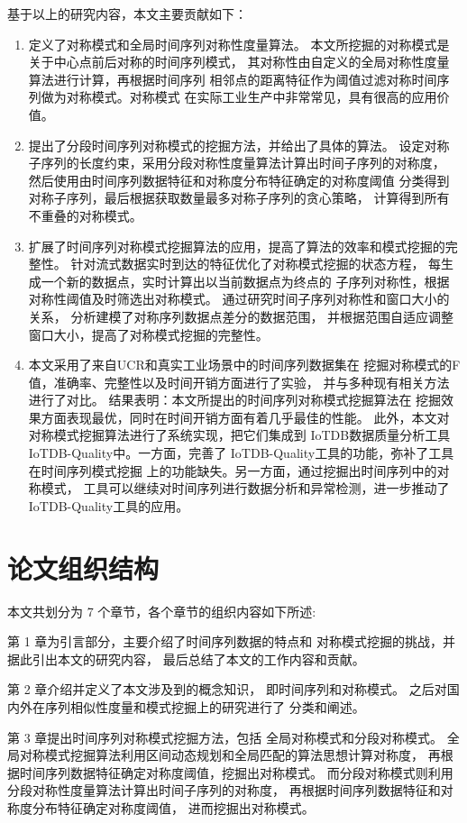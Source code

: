 基于以上的研究内容，本文主要贡献如下：
\begin{enumerate}
\item 定义了对称模式和全局时间序列对称性度量算法。
本文所挖掘的对称模式是关于中心点前后对称的时间序列模式，
其对称性由自定义的全局对称性度量算法进行计算，再根据时间序列
相邻点的距离特征作为阈值过滤对称时间序列做为对称模式。对称模式
在实际工业生产中非常常见，具有很高的应用价值。
\item 提出了分段时间序列对称模式的挖掘方法，并给出了具体的算法。
设定对称子序列的长度约束，采用分段对称性度量算法计算出时间子序列的对称度，
然后使用由时间序列数据特征和对称度分布特征确定的对称度阈值
分类得到对称子序列，最后根据获取数量最多对称子序列的贪心策略，
计算得到所有不重叠的对称模式。
\item 扩展了时间序列对称模式挖掘算法的应用，提高了算法的效率和模式挖掘的完整性。
针对流式数据实时到达的特征优化了对称模式挖掘的状态方程，
每生成一个新的数据点，实时计算出以当前数据点为终点的
子序列对称性，根据对称性阈值及时筛选出对称模式。
通过研究时间子序列对称性和窗口大小的关系，
分析建模了对称序列数据点差分的数据范围，
并根据范围自适应调整窗口大小，提高了对称模式挖掘的完整性。
\item 本文采用了来自UCR和真实工业场景中的时间序列数据集在
挖掘对称模式的F值，准确率、完整性以及时间开销方面进行了实验，
并与多种现有相关方法进行了对比。
结果表明：本文所提出的时间序列对称模式挖掘算法在
挖掘效果方面表现最优，同时在时间开销方面有着几乎最佳的性能。
此外，本文对对称模式挖掘算法进行了系统实现，把它们集成到
IoTDB数据质量分析工具IoTDB-Quality中。一方面，完善了
IoTDB-Quality工具的功能，弥补了工具在时间序列模式挖掘
上的功能缺失。另一方面，通过挖掘出时间序列中的对称模式，
工具可以继续对时间序列进行数据分析和异常检测，进一步推动了
IoTDB-Quality工具的应用。
\end{enumerate}

\section{论文组织结构}

本文共划分为 7 个章节，各个章节的组织内容如下所述:

第 1 章为引言部分，主要介绍了时间序列数据的特点和
对称模式挖掘的挑战，并据此引出本文的研究内容，
最后总结了本文的工作内容和贡献。

第 2 章介绍并定义了本文涉及到的概念知识，
即时间序列和对称模式。
之后对国内外在序列相似性度量和模式挖掘上的研究进行了
分类和阐述。

第 3 章提出时间序列对称模式挖掘方法，包括
全局对称模式和分段对称模式。
全局对称模式挖掘算法利用区间动态规划和全局匹配的算法思想计算对称度，
再根据时间序列数据特征确定对称度阈值，挖掘出对称模式。
而分段对称模式则利用分段对称性度量算法计算出时间子序列的对称度，
再根据时间序列数据特征和对称度分布特征确定对称度阈值，
进而挖掘出对称模式。

